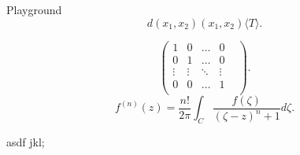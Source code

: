 \documentclass[class=article, crop=false]{standalone}
\begin{document}
\begin{zettel}{Playground}
\[
    d(x_1,x_2) (x_1,x_2) \langle T\rangle 
.\]

\[
    \begin{pmatrix}
    1       & 0       &  \dots  & 0 \\
    0       & 1       &  \dots  & 0 \\
     \vdots &  \vdots &  \ddots &  \vdots &  \\
    0       & 0       &  \dots  & 1 \\
    \end{pmatrix}
.\]
\[
f ^{(n)}(z) =  \frac{n!}{2 \pi } \int_{C}^{} \frac{f (\zeta)}{(\zeta-z)^n+1 } d \zeta
.\]


asdf jkl;

\end{zettel}
\end{document}
